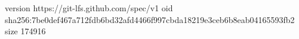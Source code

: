 version https://git-lfs.github.com/spec/v1
oid sha256:7be0def467a712fdb6bd32afd4466f997cbda18219e3ceb6b8eab04165593fb2
size 174916
